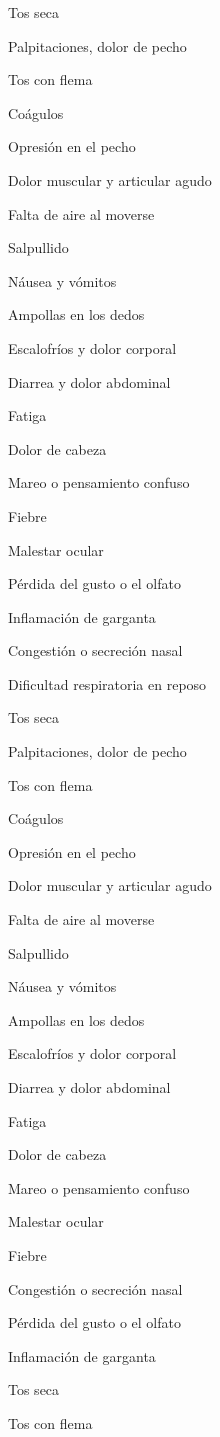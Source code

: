 Tos seca

Palpitaciones, dolor de pecho

Tos con flema

Coágulos

Opresión en el pecho

Dolor muscular y articular agudo

Falta de aire al moverse

Salpullido

Náusea y vómitos

Ampollas en los dedos

Escalofríos y dolor corporal

Diarrea y dolor abdominal

Fatiga

Dolor de cabeza

Mareo o pensamiento confuso

Fiebre

Malestar ocular

Pérdida del gusto o el olfato

Inflamación de garganta

Congestión o secreción nasal

Dificultad respiratoria en reposo

Tos seca

Palpitaciones, dolor de pecho

Tos con flema

Coágulos

Opresión en el pecho

Dolor muscular y articular agudo

Falta de aire al moverse

Salpullido

Náusea y vómitos

Ampollas en los dedos

Escalofríos y dolor corporal

Diarrea y dolor abdominal

Fatiga

Dolor de cabeza

Mareo o pensamiento confuso

Malestar ocular

Fiebre

Congestión o secreción nasal

Pérdida del gusto o el olfato

Inflamación de garganta

Tos seca

Tos con flema

